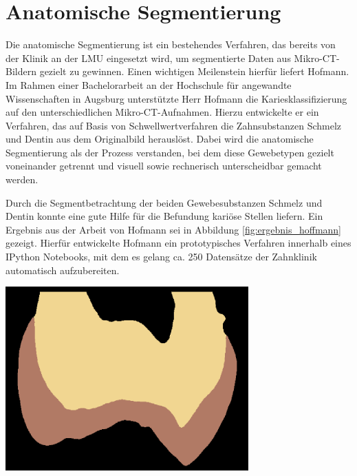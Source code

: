 \chapter{Anatomische Segmentierung}
\label{chap:theoretische_grundlagen} Die anatomische Segmentierung ist ein bestehendes
Verfahren, das bereits von der Klinik an der LMU eingesetzt wird, um segmentierte
Daten aus Mikro-\ac{CT}-Bildern gezielt zu gewinnen. Einen wichtigen Meilenstein
hierfür liefert Hofmann. Im Rahmen einer Bachelorarbeit an der Hochschule für
angewandte Wissenschaften in Augsburg unterstützte Herr Hofmann die
Kariesklassifizierung auf den unterschiedlichen Mikro-\ac{CT}-Aufnahmen. Hierzu
entwickelte er ein Verfahren, das auf Basis von Schwellwertverfahren die Zahnsubstanzen
Schmelz und Dentin aus dem Originalbild herauslöst. Dabei wird die anatomische
Segmentierung als der Prozess verstanden, bei dem diese Gewebetypen gezielt voneinander
getrennt und visuell sowie rechnerisch unterscheidbar gemacht werden.

\begin{minipage}{0.40\textwidth}
	Durch die Segmentbetrachtung der beiden Gewebesubstanzen Schmelz und Dentin konnte
	\citet[S.~41]{hoffmann2020} eine gute Hilfe für die Befundung kariöse Stellen
	liefern. Ein Ergebnis aus der Arbeit von Hofmann sei in Abbildung \ref{fig:ergebnis_hoffmann}
	gezeigt. Hierfür entwickelte Hofmann ein prototypisches Verfahren innerhalb
	eines IPython Notebooks, mit dem es gelang ca. 250 Datensätze der Zahnklinik
	automatisch aufzubereiten.
\end{minipage}
\hfill
\begin{minipage}{0.50\textwidth}
	\centering
	\includegraphics[width=0.7\textwidth]{img/ergebnis_hoffmann_2.jpg}
	 \label{fig:ergebnis_hoffmann}
\end{minipage}

